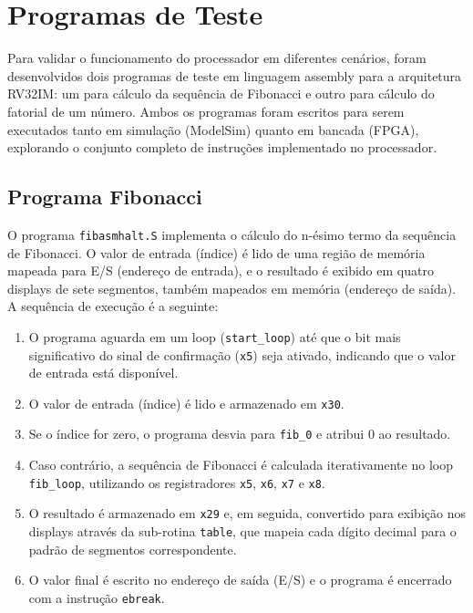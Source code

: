 \documentclass[
	12pt,				%
	oneside,
	a4paper,			%
	english,			%
	french,				%
	spanish,			%
	brazil,				%
	]{abntex2}
\begin{document}
\section{Programas de Teste}

Para validar o funcionamento do processador em diferentes cenários, foram desenvolvidos dois programas de teste em linguagem assembly para a arquitetura RV32IM: um para cálculo da sequência de Fibonacci e outro para cálculo do fatorial de um número. Ambos os programas foram escritos para serem executados tanto em simulação (ModelSim) quanto em bancada (FPGA), explorando o conjunto completo de instruções implementado no processador.

\subsection{Programa Fibonacci}

O programa \texttt{fibasmhalt.S} implementa o cálculo do n-ésimo termo da sequência de Fibonacci. O valor de entrada (índice) é lido de uma região de memória mapeada para E/S (endereço de entrada), e o resultado é exibido em quatro displays de sete segmentos, também mapeados em memória (endereço de saída). A sequência de execução é a seguinte:

\begin{enumerate}
  \item O programa aguarda em um loop (\texttt{start\_loop}) até que o bit mais significativo do sinal de confirmação (\texttt{x5}) seja ativado, indicando que o valor de entrada está disponível.
  \item O valor de entrada (índice) é lido e armazenado em \texttt{x30}.
  \item Se o índice for zero, o programa desvia para \texttt{fib\_0} e atribui 0 ao resultado.
  \item Caso contrário, a sequência de Fibonacci é calculada iterativamente no loop \texttt{fib\_loop}, utilizando os registradores \texttt{x5}, \texttt{x6}, \texttt{x7} e \texttt{x8}.
  \item O resultado é armazenado em \texttt{x29} e, em seguida, convertido para exibição nos displays através da sub-rotina \texttt{table}, que mapeia cada dígito decimal para o padrão de segmentos correspondente.
  \item O valor final é escrito no endereço de saída (E/S) e o programa é encerrado com a instrução \texttt{ebreak}.
\end{enumerate}
\end{document}
